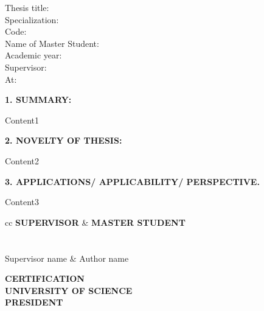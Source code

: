 \begin{flushleft}
	Thesis title:  \\
	Specialization:  \\
	Code:  \\
	Name of Master Student:  \\
	Academic year:  \\
	Supervisor: \\
	At: \\
\end{flushleft}

\textbf{1. SUMMARY:}

Content1

\textbf{2. NOVELTY OF THESIS:}

Content2

\textbf{3. APPLICATIONS/ APPLICABILITY/ PERSPECTIVE.}

Content3


\vspace{1.5em}
\begin{tblr}{cc}
	\centering
	\textbf{SUPERVISOR} & \textbf{\hspace{8.0em}MASTER STUDENT} \\
	\\
	\\
	Supervisor name     & \hspace{8.0em} Author name
\end{tblr}

\vspace{2.5em}
\begin{center}
	\textbf{CERTIFICATION}\\
	\textbf{UNIVERSITY OF SCIENCE} \\
	\textbf{PRESIDENT}
\end{center}